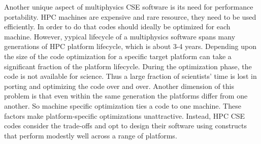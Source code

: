 Another unique aspect of multiphysics CSE software is its need for
performance portability. HPC machines are expensive and rare resource,
they need to be used efficiently. In order to do that codes should
ideally be optimized for each machine. However, yypical lifecycle of a
multiphysics software spans many generations of HPC platform
lifecycle, which is about 3-4 years. Depending upon the size of the
code optimization for a specific target platform can take a
significant fraction of the platform lifecycle. During the
optimization phase, the code is not available for science. Thus a
large fraction of scientists' time is lost in porting and optimizing
the code over and over. Another dimension of this problem is that even
within the same generation the platforms differ from one another. So
machine specific optimization ties a code to one machine. These
factors make platform-specific optimizations unattractive. Instead,
HPC CSE codes consider the trade-offs and opt to design their software
using constructs that perform modestly well across a range of
platforms. 



